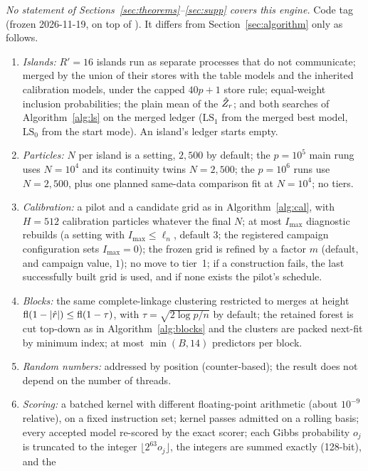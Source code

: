 \emph{No statement of Sections~\ref{sec:theorems}--\ref{sec:supp} covers this engine.} Code tag 
(frozen 2026-11-19, on top of ). It differs from Section~\ref{sec:algorithm} only as follows.
\begin{enumerate}[leftmargin=2em,itemsep=1pt]
  \item \emph{Islands:} $R'=16$ islands run as separate processes that do not communicate; merged by the union of their
    stores with the table models and the inherited calibration models, under the capped $40p+1$ store rule;
    equal-weight inclusion probabilities; the plain mean of the $\hat Z_r$; and both searches of Algorithm~\ref{alg:ls} on the
    merged ledger ($\mathrm{LS}_1$ from the merged best model, $\mathrm{LS}_0$ from the start mode). An island's ledger starts empty.
  \item \emph{Particles:} $N$ per island is a setting, $2{,}500$ by default; the $p=10^5$ main rung uses $N=10^4$ and its
    continuity twins $N=2{,}500$; the $p=10^6$ runs use $N=2{,}500$, plus one planned same-data comparison fit at $N=10^4$; no tiers.
  \item \emph{Calibration:} a pilot and a candidate grid as in Algorithm~\ref{alg:cal}, with $H=512$ calibration particles whatever
    the final $N$; at most $I_{\max}$ diagnostic rebuilds (a setting with $I_{\max}\le\ell_n$, default $3$; the registered
    campaign configuration sets $I_{\max}=0$); the frozen grid is refined by a factor $m$ (default, and campaign value, $1$); no
    move to tier~1; if a construction fails, the last successfully built grid is used, and if none exists the pilot's schedule.
  \item \emph{Blocks:} the same complete-linkage clustering restricted to merges at height $\mathrm{fl}(1-\lvert \hat r\rvert)\le\mathrm{fl}(1-\tau)$,
    with $\tau=\sqrt{2\log p/n}$ by default; the retained forest is cut top-down as in Algorithm~\ref{alg:blocks} and the clusters are
    packed next-fit by minimum index; at most $\min(B,14)$ predictors per block.
  \item \emph{Random numbers:} addressed by position (counter-based); the result does not depend on the number of threads.
  \item \emph{Scoring:} a batched kernel with different floating-point arithmetic (about $10^{-9}$ relative), on a fixed
    instruction set; kernel passes admitted on a rolling basis; every accepted model re-scored by the exact scorer;
    each Gibbs probability $o_j$ is truncated to the integer $\lfloor2^{63}o_j\rfloor$, the integers are summed exactly (128-bit), and the

\end{enumerate}

